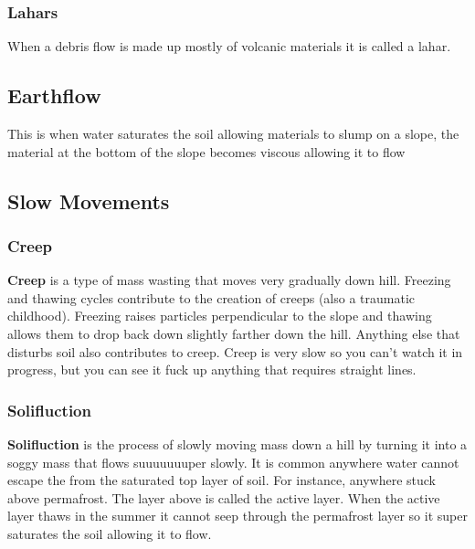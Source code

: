 \documentclass{article}
\begin{document}
\subsubsection{Lahars} %
\label{ssub:lahars}
When a debris flow is made up mostly of volcanic materials it is called a lahar.
\subsection{Earthflow} %
\label{sub:earthflow}
This is when water saturates the soil allowing materials to slump on a slope, the material at the bottom of the slope becomes viscous allowing it to flow
\subsection{Slow Movements} %
\label{sub:slow_movements}
\subsubsection{Creep} %
\label{ssub:creep}
\textbf{Creep} is a type of mass wasting that moves very gradually down hill. Freezing and thawing cycles contribute to the creation of creeps (also a traumatic childhood). Freezing raises particles perpendicular to the slope and thawing allows them to drop back down slightly farther down the hill. Anything else that disturbs soil also contributes to creep. Creep is very slow so you can't watch it in progress, but you can see it fuck up anything that requires straight lines.

\subsubsection{Solifluction} %
\label{ssub:solifluction}
\textbf{Solifluction} is the process of slowly moving mass down a hill by turning it into a soggy mass that flows suuuuuuuper slowly. It is common anywhere water cannot escape the from the saturated top layer of soil. For instance, anywhere stuck above permafrost. The layer above is called the active layer. When the active layer thaws in the summer it cannot seep through the permafrost layer so it super saturates the soil allowing it to flow.
\end{document}
